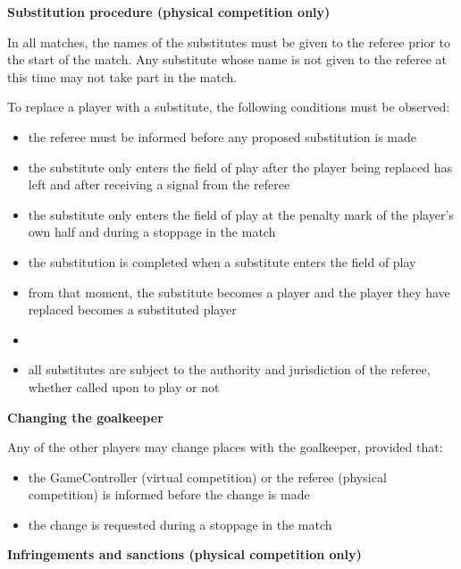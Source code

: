 {\bfseries Substitution procedure (physical competition only)}

\headlinebox

In all matches, the names of the substitutes must be given to the referee prior to the start of the match. Any substitute whose name is not given to the referee at this time may not take part in the match.

\bigskip

To replace a player with a substitute, the following conditions must be observed:

\begin{itemize}
\item the referee must be informed before any proposed substitution is made
\item the substitute only enters the field of play after the player being replaced has left and after receiving a signal from the referee
\item the substitute only enters the field of play at the penalty mark of the player's own half  and during a stoppage in the match
\item the substitution is completed when a substitute enters the field of play
\item from that moment, the substitute becomes a player and the player they have replaced becomes a substituted player
\item {}
\item all substitutes are subject to the authority and jurisdiction of the referee, whether called upon to play or not
\end{itemize}

{\bfseries Changing the goalkeeper}

\headlinebox

Any of the other players may change places with the goalkeeper, provided that:

\begin{itemize}
      \item the GameController (virtual competition) or the referee (physical competition) is informed before the change is made
      \item the change is requested during a stoppage in the match
\end{itemize}

{\bfseries Infringements and sanctions (physical competition only)}

\headlinebox

